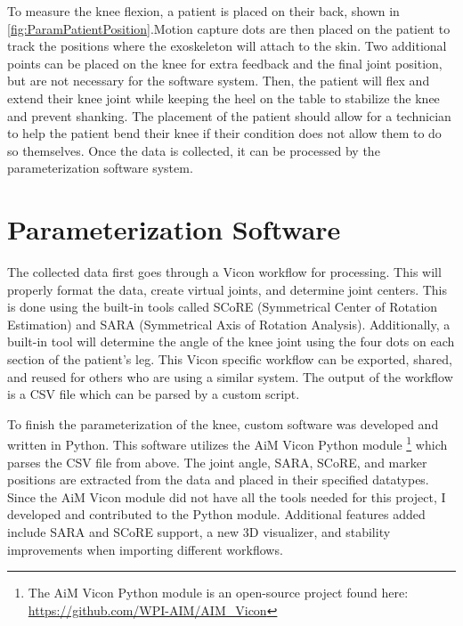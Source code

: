 To measure the knee flexion, a patient is placed on their back, shown in \autoref{fig:ParamPatientPosition}.Motion capture dots are then placed on the patient to track the positions where the exoskeleton will attach to the skin. Two additional points can be placed on the knee for extra feedback and the final joint position, but are not necessary for the software system. Then, the patient will flex and extend their knee joint while keeping the heel on the table to stabilize the knee and prevent shanking. The placement of the patient should allow for a technician to help the patient bend their knee if their condition does not allow them to do so themselves. Once the data is collected, it can be processed by the parameterization software system.

\section{Parameterization Software}
The collected data first goes through a Vicon workflow for processing. This will properly format the data, create virtual joints, and determine joint centers. This is done using the built-in tools called SCoRE (Symmetrical Center of Rotation Estimation) and SARA (Symmetrical Axis of Rotation Analysis). Additionally, a built-in tool will determine the angle of the knee joint using the four dots on each section of the patient's leg. This Vicon specific workflow can be exported, shared, and reused for others who are using a similar system. The output of the workflow is a CSV file which can be parsed by a custom script.

To finish the parameterization of the knee, custom software was developed and written in Python. This software utilizes the AiM Vicon Python module \footnote{The AiM Vicon Python module is an open-source project found here: \url{https://github.com/WPI-AIM/AIM_Vicon}} which parses the CSV file from above. The joint angle, SARA, SCoRE, and marker positions are extracted from the data and placed in their specified datatypes. Since the AiM Vicon module did not have all the tools needed for this project, I developed and contributed to the Python module. Additional features added include SARA and SCoRE support, a new 3D visualizer, and stability improvements when importing different workflows.

